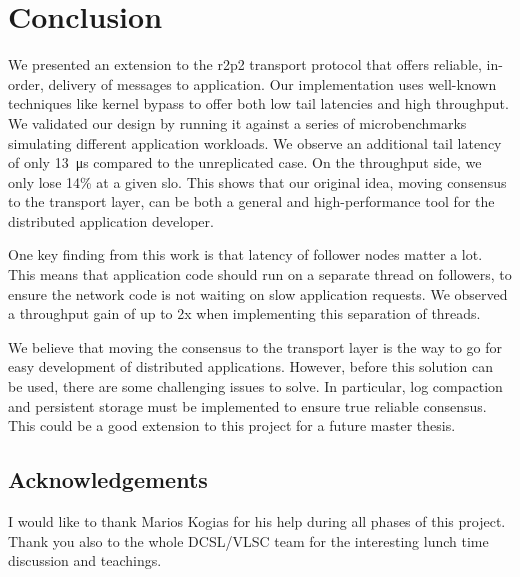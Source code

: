 \chapter{Conclusion}

We presented an extension to the \gls{r2p2} transport protocol that offers reliable, in-order, delivery of messages to application.
Our implementation uses well-known techniques like kernel bypass to offer both low tail latencies and high throughput.
We validated our design by running it against a series of microbenchmarks simulating different application workloads.
We observe an additional tail latency of only \SI{13}{\micro\second} compared to the unreplicated case.
On the throughput side, we only lose 14\% at a given \gls{slo}.
This shows that our original idea, moving consensus to the transport layer, can be both a general and high-performance tool for the distributed application developer. 

One key finding from this work is that latency of follower nodes matter a lot.
This means that application code should run on a separate thread on followers, to ensure the network code is not waiting on slow application requests.
We observed a throughput gain of up to 2x when implementing this separation of threads.

We believe that moving the consensus to the transport layer is the way to go for easy development of distributed applications.
However, before this solution can be used, there are some challenging issues to solve.
In particular, log compaction and persistent storage must be implemented to ensure true reliable consensus.
This could be a good extension to this project for a future master thesis.

\section*{Acknowledgements}

I would like to thank Marios Kogias for his help during all phases of this project.
Thank you also to the whole DCSL/VLSC team for the interesting lunch time discussion and teachings.
